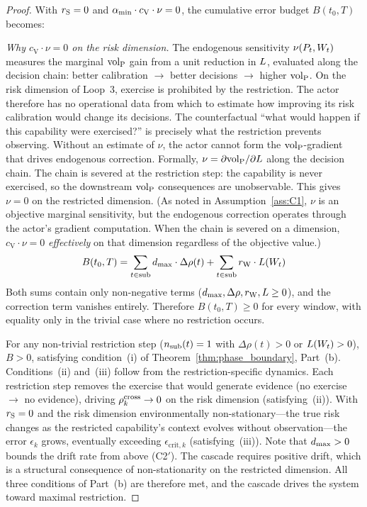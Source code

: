 \begin{proof}
With $r_{\mathrm{S}} = 0$ and $\alpha_{\min} \cdot c_{\mathrm{V}} \cdot \nu = 0$,
the cumulative error budget $B(t_0, T)$ becomes:

\emph{Why $c_{\mathrm{V}} \cdot \nu = 0$ on the risk dimension.}
The endogenous sensitivity $\nu(P_t, W_t)$ measures the marginal
${\operatorname{vol}_{\mathrm{P}}}$ gain from a unit reduction in $L$, evaluated along the
decision chain: better calibration $\to$ better decisions $\to$ higher
${\operatorname{vol}_{\mathrm{P}}}$.  On the risk dimension of Loop~3, exercise is prohibited by
the restriction.  The actor therefore has no operational data from
which to estimate how improving its risk calibration would change its
decisions.  The counterfactual ``what would happen if this capability
were exercised?'' is precisely what the restriction prevents
observing.  Without an estimate of $\nu$, the actor cannot form the
${\operatorname{vol}_{\mathrm{P}}}$-gradient that drives endogenous correction.  Formally,
$\nu = \partial {\operatorname{vol}_{\mathrm{P}}} / \partial L$ along the decision chain.
The chain is severed at the restriction step: the capability is
never exercised, so the downstream ${\operatorname{vol}_{\mathrm{P}}}$ consequences are
unobservable.  This gives $\nu = 0$ on the restricted dimension.
(As noted in Assumption~\ref{ass:C1}, $\nu$ is an objective
marginal sensitivity, but the endogenous correction operates through
the actor's gradient computation.  When the chain is severed on a
dimension, $c_{\mathrm{V}} \cdot \nu = 0$ \emph{effectively} on that
dimension regardless of the objective value.)
\begin{equation*}
B(t_0, T) = \sum_{t \in \mathrm{sub}} d_{\mathrm{max}} \cdot \Delta\rho(t)
  + \sum_{t \in \mathrm{sub}} r_{\mathrm{W}} \cdot L(W_t)
\end{equation*}
Both sums contain only non-negative terms ($d_{\mathrm{max}}, \Delta\rho, r_{\mathrm{W}},
L \geq 0$), and the correction term vanishes entirely.
Therefore $B(t_0, T) \geq 0$ for every window, with equality only in
the trivial case where no restriction occurs.

For any non-trivial restriction step ($n_{\mathrm{sub}}(t) = 1$ with
$\Delta\rho(t) > 0$ or $L(W_t) > 0$), $B > 0$, satisfying
condition~(i) of Theorem~\ref{thm:phase_boundary}, Part~(b).
Conditions~(ii) and~(iii) follow from the restriction-specific
dynamics.  Each restriction step removes the exercise that would
generate evidence (no exercise $\to$ no evidence), driving
$\rho^{\mathrm{cross}}_k \to 0$ on the risk dimension (satisfying~(ii)).  With
$r_{\mathrm{S}} = 0$ and the risk dimension environmentally non-stationary---the
true risk changes as the restricted capability's context evolves
without observation---the error $\epsilon_k$ grows, eventually
exceeding $\epsilon_{\mathrm{crit},k}$ (satisfying~(iii)).  Note that
$d_{\mathrm{max}} > 0$ bounds the drift rate from above (C2$'$).  The cascade
requires positive drift, which is a structural consequence of
non-stationarity on the restricted dimension.  All three conditions
of Part~(b) are therefore met, and the cascade drives the system
toward maximal restriction.


\end{proof}
